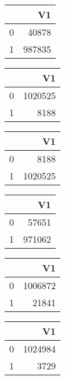 \bigskip\bigskip
\centering
\begin{tabular}{rr}
  \hline
 & V1 \\ 
  \hline
0 & 40878 \\ 
  1 & 987835 \\ 
   \hline
\end{tabular}

\bigskip\bigskip
\centering
\begin{tabular}{rr}
  \hline
 & V1 \\ 
  \hline
0 & 1020525 \\ 
  1 & 8188 \\ 
   \hline
\end{tabular}

\bigskip\bigskip
\centering
\begin{tabular}{rr}
  \hline
 & V1 \\ 
  \hline
0 & 8188 \\ 
  1 & 1020525 \\ 
   \hline
\end{tabular}

\bigskip\bigskip
\centering
\begin{tabular}{rr}
  \hline
 & V1 \\ 
  \hline
0 & 57651 \\ 
  1 & 971062 \\ 
   \hline
\end{tabular}

\bigskip\bigskip
\centering
\begin{tabular}{rr}
  \hline
 & V1 \\ 
  \hline
0 & 1006872 \\ 
  1 & 21841 \\ 
   \hline
\end{tabular}

\bigskip\bigskip
\centering
\begin{tabular}{rr}
  \hline
 & V1 \\ 
  \hline
0 & 1024984 \\ 
  1 & 3729 \\ 
   \hline
\end{tabular}

